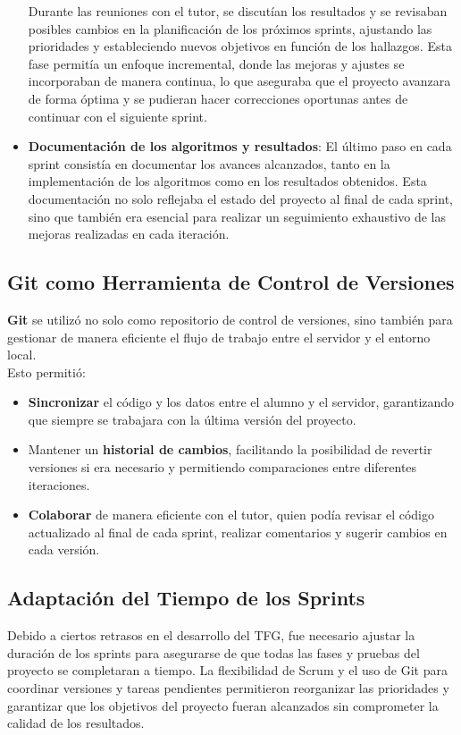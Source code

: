 \begin{itemize}
    Durante las reuniones con el tutor, se discutían los resultados y se revisaban posibles cambios en la planificación
    de los próximos sprints, ajustando las prioridades y estableciendo nuevos objetivos en función de los hallazgos.
    Esta fase permitía un enfoque incremental, donde las mejoras y ajustes se incorporaban de manera continua, lo que
    aseguraba que el proyecto avanzara de forma óptima y se pudieran hacer correcciones oportunas antes de continuar
    con el siguiente sprint.

    \item \textbf{Documentación de los algoritmos y resultados}: El último paso en cada sprint consistía en documentar
    los avances alcanzados, tanto en la implementación de los algoritmos como en los resultados obtenidos.
    Esta documentación no solo reflejaba el estado del proyecto al final de cada sprint, sino que también era esencial
    para realizar un seguimiento exhaustivo de las mejoras realizadas en cada iteración.
\end{itemize}

\subsection{Git como Herramienta de Control de Versiones}\label{subsec:git-como-herramienta-de-control-de-versiones}
\textbf{Git} se utilizó no solo como repositorio de control de versiones, sino también para gestionar de manera
eficiente el flujo de trabajo entre el servidor y el entorno local. \\[6pt]

Esto permitió:
\begin{itemize}
    \item \textbf{Sincronizar} el código y los datos entre el alumno y el servidor, garantizando que siempre se
    trabajara con la última versión del proyecto.
    \item Mantener un \textbf{historial de cambios}, facilitando la posibilidad de revertir versiones si era necesario
    y permitiendo comparaciones entre diferentes iteraciones.
    \item \textbf{Colaborar} de manera eficiente con el tutor, quien podía revisar el código actualizado al final de
    cada sprint, realizar comentarios y sugerir cambios en cada versión.
\end{itemize}

\subsection{Adaptación del Tiempo de los Sprints}\label{subsec:adaptacion-del-tiempo-de-los-sprints}
Debido a ciertos retrasos en el desarrollo del TFG, fue necesario ajustar la duración de los sprints para asegurarse de
que todas las fases y pruebas del proyecto se completaran a tiempo.
La flexibilidad de Scrum y el uso de Git para coordinar versiones y tareas pendientes permitieron reorganizar las
prioridades y garantizar que los objetivos del proyecto fueran alcanzados sin comprometer la calidad de los resultados.

